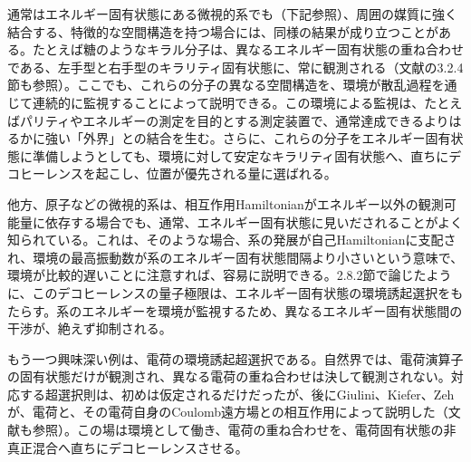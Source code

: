 通常はエネルギー固有状態にある微視的系でも（下記参照）、周囲の媒質に強く結合する、特徴的な空間構造を持つ場合には、同様の結果が成り立つことがある。たとえば糖のようなキラル分子は、異なるエネルギー固有状態の重ね合わせである、左手型と右手型のキラリティ固有状態に、常に観測される\cite{ref107,ref108}（文献\cite{ref017}の3.2.4節も参照）。ここでも、これらの分子の異なる空間構造を、環境が散乱過程を通じて連続的に監視することによって説明できる。この環境による監視は、たとえばパリティやエネルギーの測定を目的とする測定装置で、通常達成できるよりはるかに強い「外界」との結合を生む。さらに、これらの分子をエネルギー固有状態に準備しようとしても、環境に対して安定なキラリティ固有状態へ、直ちにデコヒーレンスを起こし、位置が優先される量に選ばれる。

\hypertarget{srcpage:84}{}\label{srcpage:84}
他方、原子などの微視的系は、相互作用Hamiltonianがエネルギー以外の観測可能量に依存する場合でも、通常、エネルギー固有状態に見いだされることがよく知られている。これは、そのような場合、系の発展が自己Hamiltonianに支配され、環境の最高振動数が系のエネルギー固有状態間隔より小さいという意味で、環境が比較的遅いことに注意すれば、容易に説明できる。2.8.2節で論じたように、このデコヒーレンスの量子極限\cite{ref103}は、エネルギー固有状態の環境誘起選択をもたらす。系のエネルギーを環境が監視するため、異なるエネルギー固有状態間の干渉が、絶えず抑制される。

もう一つ興味深い例は、電荷の環境誘起超選択である。自然界では、電荷演算子の固有状態だけが観測され、異なる電荷の重ね合わせは決して観測されない。対応する超選択則は、初めは仮定されるだけだったが\cite{ref078,ref079}、後にGiulini、Kiefer、Zeh\cite{ref085}が、電荷と、その電荷自身のCoulomb遠方場との相互作用によって説明した（文献\cite{ref083}も参照）。この場は環境として働き、電荷の重ね合わせを、電荷固有状態の非真正混合へ直ちにデコヒーレンスさせる。


